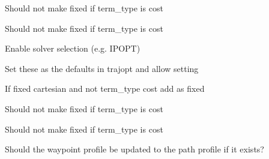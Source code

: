 \begin{DoxyRefList}
\label{todo__todo000031}%
%
Should not make fixed if term\+\_\+type is cost 

\label{todo__todo000032}%
%
Should not make fixed if term\+\_\+type is cost  
\item[Member \mbox{\hyperlink{classtesseract__planning_1_1TrajOptIfoptMotionPlanner_a8571318009fac584c15542ee8b2e4f04}{tesseract\+\_\+planning\+::Traj\+Opt\+Ifopt\+Motion\+Planner\+::solve}} (const \mbox{\hyperlink{structtesseract__planning_1_1PlannerRequest}{Planner\+Request}} \&request) const override]\label{todo__todo000028}%
%
Enable solver selection (e.\+g. IPOPT) 

\label{todo__todo000029}%
%
Set these as the defaults in trajopt and allow setting  
\item[Member \mbox{\hyperlink{classtesseract__planning_1_1TrajOptMotionPlanner_a6f42bc4743b8be6fd310b7e75282796d}{tesseract\+\_\+planning\+::Traj\+Opt\+Motion\+Planner\+::create\+Problem}} (const \mbox{\hyperlink{structtesseract__planning_1_1PlannerRequest}{Planner\+Request}} \&request) const]\label{todo__todo000025}%
%
If fixed cartesian and not term\+\_\+type cost add as fixed 

\label{todo__todo000026}%
%
Should not make fixed if term\+\_\+type is cost 

\label{todo__todo000027}%
%
Should not make fixed if term\+\_\+type is cost  
\item[Member \mbox{\hyperlink{classtesseract__planning_1_1UpdateEndStateTask_ac06636e6680de68245ea5ec5c06767cd}{tesseract\+\_\+planning\+::Update\+End\+State\+Task\+::run\+Impl}} (\mbox{\hyperlink{structtesseract__planning_1_1TaskComposerInput}{Task\+Composer\+Input}} \&input, Optional\+Task\+Composer\+Executor executor=std\+::nullopt) const override]\label{todo__todo000033}%
%
Should the waypoint profile be updated to the path profile if it exists? 
\end{DoxyRefList}